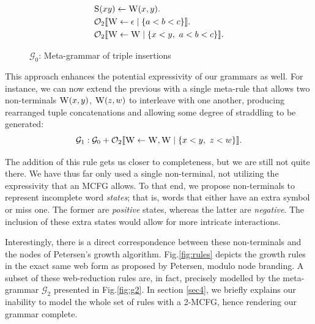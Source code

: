 \documentclass[nonatbib,numbers,10pt]{llncs}
\newcommand\s{\textsc}
\newcommand{\Orderr}[5]{
	\mathcal{#1}_{#5}\llbracket #2 \leftarrow #3 \mid \{ #4 \} \rrbracket.
}
\newcommand{\Or}[4]{\Orderr{O}{#1}{#2}{#3}{#4}}
\begin{document}
\begin{figure}
  \centering
  \begin{align*}
	&\s{S}(xy) \leftarrow \s{W}(x,y). \\
	&\Or{\s{W}}{\epsilon}{a < b < c}{2} \\
	&\Or{\s{W}}{\s{W}}{x < y,\ a < b < c}{2}
	\end{align*}
  \caption{$\mathcal{G}_0$: Meta-grammar of triple insertions}  
	\label{fig:meta-ins}
\end{figure}

This approach enhances the potential expressivity of our grammars as well. For instance, we can now extend the previous with a single meta-rule that allows two non-terminals $\s{W}(x,y)$, $\s{W}(z,w)$ to interleave with one another, producing rearranged tuple concatenations and allowing some degree of straddling to be generated:
\[
\mathcal{G}_1: \mathcal{G}_0 + \Or{\s{W}}{\s{W}, \s{W}}{x < y,\ z < w}{2}
\]

The addition of this rule gets us closer to completeness, but we are still not quite there. We have thus far only used a single non-terminal, not utilizing the expressivity that an MCFG allows. To that end, we propose non-terminals to represent incomplete word \textit{states}; that is, words that either have an extra symbol or miss one. The former are \textit{positive} states, whereas the latter are \textit{negative}. The inclusion of these extra states would allow for more intricate interactions.

Interestingly, there is a direct correspondence between these non-terminals and the nodes of Petersen's growth algorithm\cite{petersen}. Fig.\ref{fig:rules} depicts the growth rules in the exact same web form as proposed by Petersen, modulo node branding. A subset of these web-reduction rules are, in fact, precisely modelled by the meta-grammar $\mathcal{G}_2$ presented in Fig.\ref{fig:g2}. In section \ref{sec4}, we briefly explains our inability to model the whole set of rules with a 2-MCFG, hence rendering our grammar complete.
\end{document}
